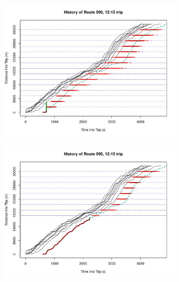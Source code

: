 \documentclass[11pt]{article}\usepackage[]{graphicx}\usepackage[]{color}
\begin{document}
\begin{figure}[bp]
  \centering
  \begin{subfigure}{0.33\textwidth}
    \centering
    \includegraphics[width=\textwidth]{hist/route090_1215_001.jpg}
    \label{fig:route090-history-1}
  \end{subfigure}%
  \begin{subfigure}{0.33\textwidth}
    \centering
    \includegraphics[width=\textwidth]{hist/route090_1215_040.jpg}
    \label{fig:route090-history-2}
  \end{subfigure}%
  \begin{subfigure}{0.33\textwidth}  
    \centering

\end{subfigure}
\end{figure}
\end{document}
